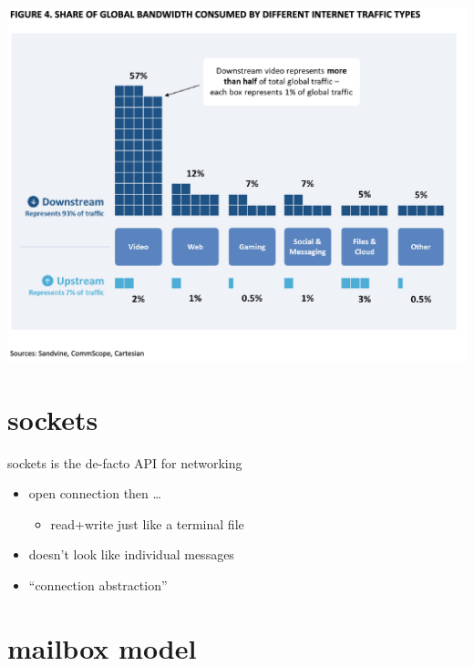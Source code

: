 \begin{frame}{}
\begin{center}
\includegraphics[width=0.8\pagewidth]{internet_data.png}
\end{center}
\end{frame}


\section{sockets}

\begin{frame}{sockets is the de-facto API for networking}
    \begin{itemize}
    \item open connection then \ldots
        \begin{itemize}
        \item read+write just like a terminal file
        \end{itemize}
    \vspace{.5cm}
    \item doesn't look like individual messages
    \item ``connection abstraction''
    \end{itemize}
\end{frame}

\section{mailbox model}


